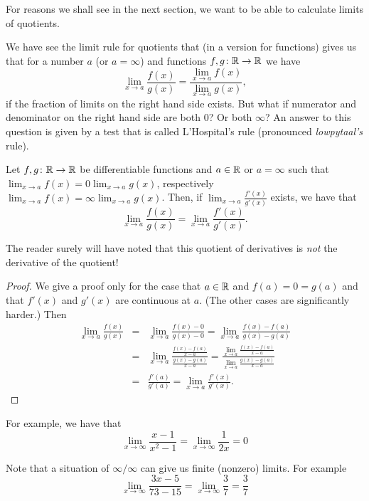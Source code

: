 For reasons we shall see in the next section, we want to be able to
calculate limits of quotients.

We have see the limit rule for quotients that (in a version for
functions) gives us that for a number $a$ (or $a=\infty$) and functions
$f,g\colon{\mathbb R}\to{\mathbb R}$ we have
\[
\lim_{x\to a}\frac{f(x)}{g(x)}=\frac{\lim_{x\to a}f(x)}{\lim_{x\to a}g(x)},
\]
if the fraction of limits on the right hand side exists. But what if
numerator and denominator on the right hand side are both $0$? Or both
$\infty$? An answer to this question is given by a test that is
called
L'Hospital's rule (pronounced {\em lowpytaal's} rule).

\begin{thm}
Let $f,g\colon{\mathbb R}\to{\mathbb R}$ be differentiable functions and $a\in{\mathbb R}$ or
$a=\infty$ such that $\lim_{x\to a}f(x)=0\lim_{x\to a}g(x)$, respectively
$\lim_{x\to a}f(x)=\infty\lim_{x\to a}g(x)$. Then, if $\lim_{x\to
a}\frac{f'(x)}{g'(x)}$ exists, we have that
\[
\lim_{x\to a}\frac{f(x)}{g(x)}=\lim_{x\to a}\frac{f'(x)}{g'(x)}.
\]
\end{thm}
The reader surely will have noted that this quotient of derivatives is {\em
not} the derivative of the quotient!\\
\begin{proof}
We give a proof only for the case that $a\in{\mathbb R}$ and $f(a)=0=g(a)$ and that
$f'(x)$ and $g'(x)$ are continuous at $a$. (The other cases are
significantly harder.) Then
\begin{eqnarray*}
\lim_{x\to a}\frac{f(x)}{g(x)}
&=&\lim_{x\to a}\frac{f(x)-0}{g(x)-0}
=\lim_{x\to a}\frac{f(x)-f(a)}{g(x)-g(a)}\\
&=&\lim_{x\to a}\frac{\frac{f(x)-f(a)}{x-a}}{\frac{g(x)-g(a)}{x-a}}
=
\frac{\lim_{x\to a}\frac{f(x)-f(a)}{x-a}}{\lim_{x\to
a}\frac{g(x)-g(a)}{x-a}}\\
&=&\frac{f'(a)}{g'(a)}=\lim_{x\to a}\frac{f'(x)}{g'(x)}.
\end{eqnarray*}
\end{proof}

For example, we have that
\[
\lim_{x\to\infty}\frac{x-1}{x^2-1}=
\lim_{x\to\infty}\frac{1}{2x}=0
\]

Note that a situation of $\infty/\infty$ can give us finite (nonzero)
limits. For example
\[
\lim_{x\to\infty}\frac{3x-5}{73-15}=
\lim_{x\to\infty}\frac{3}{7}=\frac{3}{7}
\]

